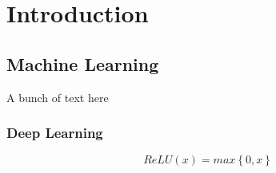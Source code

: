 \pagestyle{fancyArabic}
\section{Introduction}
\vspace{-3em}
\subsection{Machine Learning}
\label{sec:machine learning}
\vspace{-2em}
\hspace{\parindent} 

A bunch of text here \cite{daskalakis_independent_2021}

\blindtext


\vspace{-2em}
\newpage
\subsubsection{Deep Learning}
\label{sec:deep learning}
\vspace{-2em}
\hspace{\parindent} \blindtext

\vspace{-2em}
\begin{equation}\label{eq:relu}
    ReLU(x) = max\left\{0,x\right\}
\end{equation}
